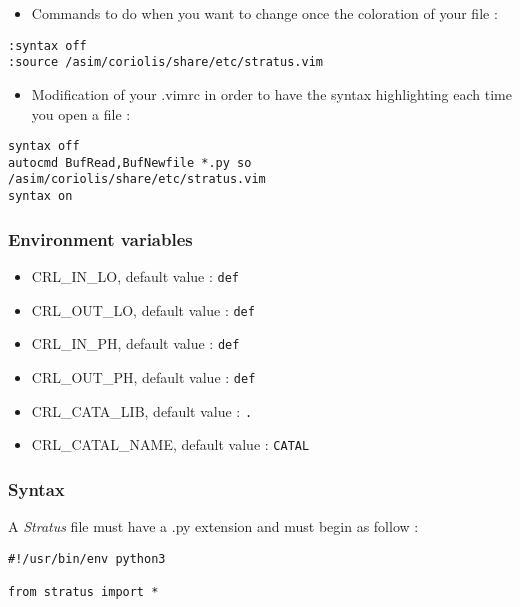 \begin{itemize}
    \item Commands to do when you want to change once the coloration of your file :
\end{itemize}
\begin{small}
\begin{verbatim}
:syntax off
:source /asim/coriolis/share/etc/stratus.vim
\end{verbatim}
\end{small}
\begin{itemize}
    \item Modification of your .vimrc in order to have the syntax highlighting each time you open a file :
\end{itemize}
\begin{small}
\begin{verbatim}
syntax off
autocmd BufRead,BufNewfile *.py so /asim/coriolis/share/etc/stratus.vim
syntax on
\end{verbatim}
\end{small}
        
\subsubsection{Environment variables}

\begin{itemize}
    \item CRL\_IN\_LO, default value : \verb-def-
    \item CRL\_OUT\_LO, default value : \verb-def-
    \item CRL\_IN\_PH, default value : \verb-def-
    \item CRL\_OUT\_PH, default value : \verb-def-
    \item CRL\_CATA\_LIB, default value : \verb-.-
    \item CRL\_CATAL\_NAME, default value : \verb-CATAL-
\end{itemize}

\subsubsection{Syntax}

A \emph{Stratus} file must have a .py extension and must begin as follow :
\begin{verbatim}
#!/usr/bin/env python3

from stratus import *
\end{verbatim}

